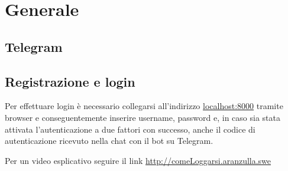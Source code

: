 \section{Generale}
	
	\subsection{Telegram}

	\subsection{Registrazione e login}
	
	Per effettuare login è necessario collegarsi all'indirizzo \url{localhost:8000} tramite browser e conseguentemente inserire username, password e, in caso sia stata attivata l'autenticazione a due fattori con successo, anche il codice di autenticazione ricevuto nella chat con il bot su Telegram.

	Per un video esplicativo seguire il link \url{http://comeLoggarsi.aranzulla.swe}
